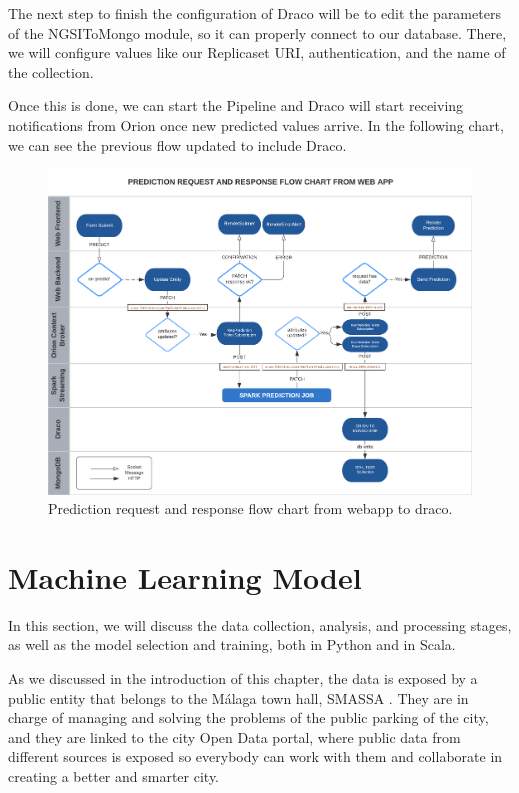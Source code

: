 The next step to finish the configuration of Draco will be to edit the parameters of the NGSIToMongo module, so it can properly connect to our database. There, we will configure values like our Replicaset URI, authentication, and the name of the collection.

Once this is done, we can start the Pipeline and Draco will start receiving notifications from Orion once new predicted values arrive. In the following chart, we can see the previous flow updated to include Draco.

\begin{figure}[H]
	\centering
	\includegraphics[width=1\linewidth]{imagenes/flow-chart-web-draco.png}
	\caption{Prediction request and response flow chart from webapp to draco.}
	\label{flow-chart-web-draco}
\end{figure}

\clearpage

\section{Machine Learning Model}
\label{section:ML}

In this section, we will discuss the data collection, analysis, and processing stages, as well as the model selection and training, both in Python and in Scala. 

As we discussed in the introduction of this chapter, the data is exposed by a public entity that belongs to the Málaga town hall, SMASSA \cite{smassa}. They are in charge of managing and solving the problems of the public parking of the city, and they are linked to the city Open Data portal, where public data from different sources is exposed so everybody can work with them and collaborate in creating a better and smarter city.

